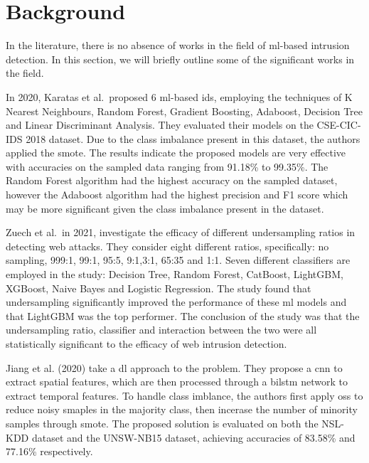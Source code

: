 \graphicspath{{content/chapters/2_background/figures/}}

\chapter{Background}%
\label{chp:background}

%
In the literature, there is no absence of works in the field of \gls{ml}-based
intrusion detection. In this section, we will briefly outline some of the
significant works in the field.

In 2020, Karatas et al.\ proposed 6 \gls{ml}-based \gls{ids}, employing the
techniques of K Nearest Neighbours, Random Forest, Gradient Boosting, Adaboost,
Decision Tree and Linear Discriminant Analysis. They evaluated their models on
the CSE-CIC-IDS 2018 dataset. Due to the class imbalance present in this
dataset, the authors applied the \gls{smote}. The results indicate the proposed
models are very effective with accuracies on the sampled data ranging from
91.18\% to 99.35\%. The Random Forest algorithm had the highest accuracy on the
sampled dataset, however the Adaboost algorithm had the highest precision and
F1 score which may be more significant given the class imbalance present in the
dataset.

Zuech et al.\ in 2021, investigate the efficacy of different undersampling
ratios in detecting web attacks. They consider eight different ratios,
specifically: no sampling, 999:1, 99:1, 95:5, 9:1,3:1, 65:35 and 1:1. Seven
different classifiers are employed in the study: Decision Tree, Random Forest,
CatBoost, LightGBM, XGBoost, Naive Bayes and Logistic Regression. The study
found that undersampling significantly improved the performance of these
\gls{ml} models and that LightGBM was the top performer. The conclusion of the
study was that the undersampling ratio, classifier and interaction between the
two were all statistically significant to the efficacy of web intrusion
detection.

Jiang et al. (2020) take a \gls{dl} approach to the problem. They propose a
\gls{cnn} to extract spatial features, which are then processed through a
\gls{bilstm} network to extract temporal features. To handle class imblance,
the authors first apply \gls{oss} to reduce noisy smaples in the
majority class, then incerase the number of minority samples through
\gls{smote}. The proposed solution is evaluated on both the NSL-KDD dataset and
the UNSW-NB15 dataset, achieving accuracies of 83.58\% and 77.16\%
respectively.


